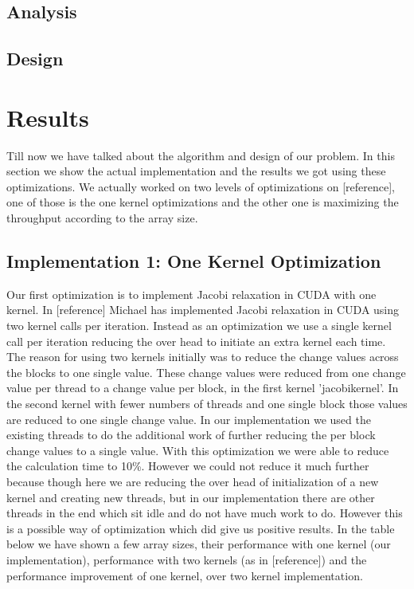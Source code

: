 \documentclass[11pt, twocolumn]{article}
\begin{document}
    \subsection{Analysis} %
    \subsection{Design} %

\section{Results} %
Till now we have talked about the algorithm and design of our problem.
In this section we show the actual implementation and the results we got using these optimizations.
We actually worked on two levels of optimizations on [reference], one of those is the one kernel optimizations and the other one is maximizing the throughput according to the array size.
    \subsection{Implementation 1: One Kernel Optimization}
    Our first optimization is to implement Jacobi relaxation in CUDA with one kernel.
    In [reference] Michael has implemented Jacobi relaxation in CUDA using two kernel calls per iteration.
    Instead as an optimization we use a single kernel call per iteration reducing the over head to initiate an extra kernel each time.
    The reason for using two kernels initially was to reduce the change values across the blocks to one single value.
    These change values were reduced from one change value per thread to a change value per block, in the first kernel 'jacobikernel'.
    In the second kernel with fewer numbers of threads and one single block those values are reduced to one single change value.
    In our implementation we used the existing threads to do the additional work of further reducing the per block change values to a single value.
    With this optimization we were able to reduce the calculation time to 10\%.
    However we could not reduce it much further because though here we are reducing the over head of initialization of a new kernel and creating new threads, but in our implementation there are other threads in the end which sit idle and do not have much work to do.
    However this is a possible way of optimization which did give us positive results.
    In the table below we have shown a few array sizes, their performance with one kernel (our implementation), performance with two kernels (as in [reference]) and the performance improvement of one kernel, over two kernel implementation.
\end{document}

